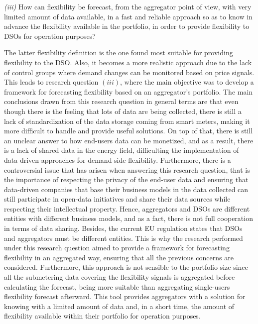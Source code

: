 \begin{tcolorbox}
\textit{(iii)} How can flexibility be forecast, from the aggregator point of view, with very limited amount of data available, in a fast and reliable approach so as to know in advance the flexibility available in the portfolio, in order to provide flexibility to DSOs for operation purposes?
\end{tcolorbox}

The latter flexibility definition is the one found most suitable for providing flexibility to the DSO. Also, it becomes a more realistic approach due to the lack of control groups where demand changes can be monitored based on price signals. This leads to research question $(iii)$, where the main objective was to develop a framework for forecasting flexibility based on an aggregator's portfolio. The main conclusions drawn from this research question in general terms are that even though there is the feeling that lots of data are being collected, there is still a lack of standardization of the data storage coming from smart meters, making it more difficult to handle and provide useful solutions. On top of that, there is still an unclear answer to how end-users data can be monetized, and as a result, there is a lack of shared data in the energy field, difficulting the implementation of data-driven approaches for demand-side flexibility. Furthermore, there is a controversial issue that has arisen when answering this research question, that is the importance of respecting the privacy of the end-user data and ensuring that data-driven companies that base their business models in the data collected can still participate in open-data initiatives and share their data sources while respecting their intellectual property. Hence, aggregators and DSOs are different entities with different business models, and as a fact, there is not full cooperation in terms of data sharing. Besides, the current EU regulation states that DSOs and aggregators must be different entities. This is why the research performed under this research question aimed to provide a framework for forecasting flexibility in an aggregated way, ensuring that all the previous concerns are considered. Furthermore, this approach is not sensible to the portfolio size since all the submetering data covering the flexibility signals is aggregated before calculating the forecast, being more suitable than aggregating single-users flexibility forecast afterward. This tool provides aggregators with a solution for knowing with a limited amount of data and, in a short time, the amount of flexibility available within their portfolio for operation purposes. 

